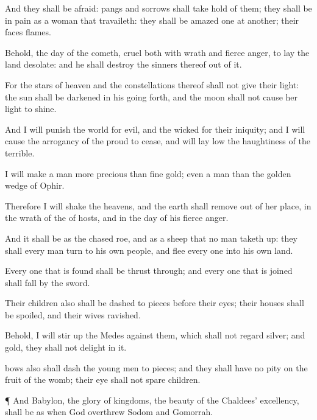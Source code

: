 {And they shall be
afraid:
pangs and
sorrows shall take
hold of them; they shall be in
pain as a woman that
travaileth: they shall be
amazed
one at
another; their
faces
{}
flames.

Behold, the
day of the
{}
cometh,
cruel both with
wrath and
fierce
anger, to
lay the
land
desolate: and he shall
destroy the
sinners thereof out of it.

For the
stars of
heaven and the
constellations thereof shall not
give their
light: the
sun shall be
darkened in his going
forth, and the
moon shall not cause her
light to
shine.

And I will
punish the
world for
{}
evil, and the
wicked for their
iniquity; and I will cause the
arrogancy of the
proud to
cease, and will lay
low the
haughtiness of the
terrible.

I will make a
man more
precious than fine
gold; even a
man than the golden
wedge of
Ophir.

Therefore I will
shake the
heavens, and the
earth shall
remove out of her
place, in the
wrath of the
{} of
hosts, and in the
day of his
fierce
anger.

And it shall be as the
chased
roe, and as a
sheep that no man taketh
up: they shall every
man
turn to his own
people, and
flee every
one into his own
land.

Every one that is
found shall be thrust
through; and every one that is
joined
{} shall
fall by the
sword.

Their
children also shall be dashed to
pieces before their
eyes; their
houses shall be
spoiled, and their
wives
ravished.

Behold, I will stir
up the
Medes against them, which shall not
regard
silver; and
{}
gold, they shall not
delight in it.

bows also shall
dash the young
men to
pieces; and they shall have no
pity on the
fruit of the
womb; their
eye shall not
spare
children.


\par }{\PP {}¶ And
Babylon, the
glory of
kingdoms, the
beauty of the
Chaldees’
excellency, shall be as when
God
overthrew
Sodom and
Gomorrah.

}
